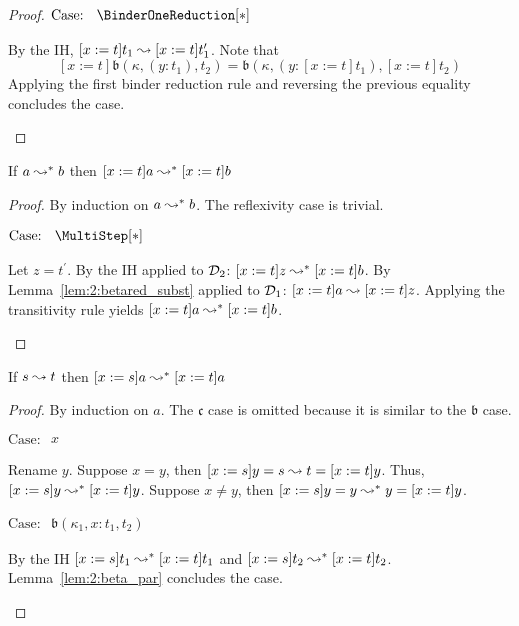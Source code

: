 \begin{proof}
    $\text{Case: }\begin{array}{c} \BinderOneReduction[*] \end{array}$
    \begin{proofcase}
        By the IH, $[x := t]t_1 \leadsto [x := t]t_1^\prime$.
        Note that $$[x := t]\mathfrak{b}(\kappa, (y : t_1), t_2) = \mathfrak{b}(\kappa, (y : [x := t]t_1), [x := t]t_2)$$
        Applying the first binder reduction rule and reversing the previous equality concludes the case.
    \end{proofcase}
\end{proof}

\begin{lemma}
    If $a \leadsto^* b$ then $[x := t]a \leadsto^* [x := t]b$
    \label{lem:2:betastar_subst_weak1}
\end{lemma}
\begin{proof}
    By induction on $a \leadsto^* b$.
    The reflexivity case is trivial.

    $\text{Case: }\begin{array}{c} \MultiStep[*] \end{array}$
    \begin{proofcase}
        Let $z = t^\prime$.
        By the IH applied to $\mathcal{D}_{2}$: $[x := t]z \leadsto^* [x := t]b$.
        By Lemma~\ref{lem:2:betared_subst} applied to $\mathcal{D}_{1}$: $[x := t]a \leadsto [x := t]z$.
        Applying the transitivity rule yields $[x := t]a \leadsto^* [x := t]b$.
    \end{proofcase}
\end{proof}

\begin{lemma}
    If $s \leadsto t$ then $[x := s]a \leadsto^* [x := t]a$
    \label{lem:2:betastar_subst_weak2}
\end{lemma}
\begin{proof}
    By induction on $a$.
    The $\mathfrak{c}$ case is omitted because it is similar to the $\mathfrak{b}$ case.

    $\text{Case: }\begin{array}{c} x \end{array}$
    \begin{proofcase}
        Rename $y$.
        Suppose $x = y$, then $[x := s]y = s \leadsto t = [x := t]y$.
        Thus, $[x := s]y \leadsto^* [x := t]y$.
        Suppose $x \neq y$, then $[x := s]y = y \leadsto^* y = [x := t]y$.
    \end{proofcase}

    $\text{Case: }\begin{array}{c} \mathfrak{b}(\kappa_1, x : t_1, t_2) \end{array}$
    \begin{proofcase}
        By the IH $[x := s]t_1 \leadsto^* [x := t]t_1$ and $[x := s]t_2 \leadsto^* [x := t]t_2$.
        Lemma~\ref{lem:2:beta_par} concludes the case.
    \end{proofcase}
\end{proof}

